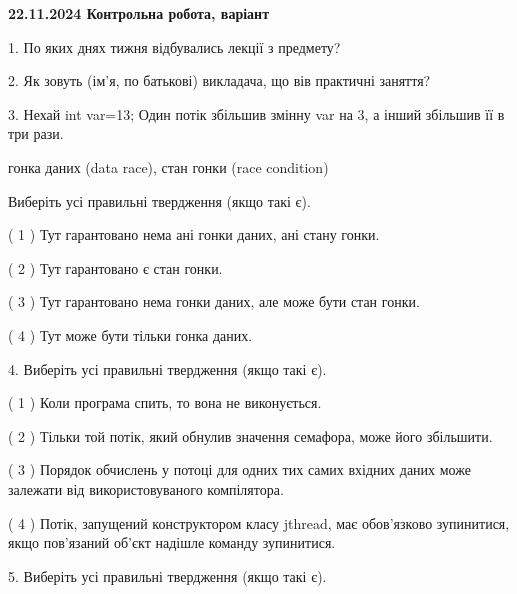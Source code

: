 \documentclass[12pt, ukrainian]{article}
\begin{document}
\vspace{4mm}
\newpage
\begin {large}

\textbf{22.11.2024 Контрольна робота, варіант  }\par


{
1. По яких днях тижня відбувались лекції з предмету?



\vspace{5mm}
2. Як зовуть (ім'я, по батькові) викладача, що вів практичні заняття?



\vspace{5mm}
3. Нехай int var=13; Один потік збільшив змінну var на 3, а інший збільшив її в три рази.

гонка даних (data race), стан гонки (race condition)

Виберіть усі правильні твердження (якщо такі є).\par
\vspace{2mm}
( 1 ) Тут гарантовано нема ані гонки даних, ані стану гонки.%

( 2 ) Тут гарантовано є стан гонки.%

( 3 ) Тут гарантовано нема гонки даних, але може бути стан гонки.%

( 4 ) Тут може бути тільки гонка даних.%


\vspace{5mm}
4. Виберіть усі правильні твердження (якщо такі є).\par
\vspace{2mm}

( 1 ) Коли програма спить, то вона не виконується.%

( 2 ) Тільки той потік, який обнулив значення семафора, може його збільшити.%

( 3 ) Порядок обчислень у потоці для одних тих самих вхідних даних може залежати від використовуваного компілятора.%

( 4 ) Потік, запущений конструктором класу jthread, має обов’язково зупинитися, якщо пов’язаний об’єкт надішле команду зупинитися.%


\vspace{5mm}
5. Виберіть усі правильні твердження (якщо такі є).\par
\vspace{2mm}

}
\end{large}
\end{document}
